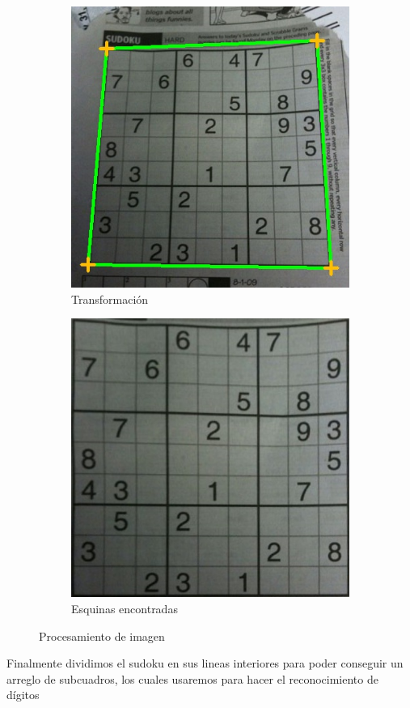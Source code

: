 \documentclass{article}
\begin{document}
\begin{figure}[H]
\centering
\begin{subfigure}{.5\textwidth}
  \centering
  \includegraphics[width=.6\linewidth]{esquinas}
  \caption{Transformaci\'on}
  \label{fig:sub1}
\end{subfigure}%
\begin{subfigure}{.5\textwidth}
  \centering
  \includegraphics[width=.6\linewidth]{transformada}
  \caption{Esquinas encontradas}
  \label{fig:sub2}
\end{subfigure}
\caption{Procesamiento de imagen}
\label{fig:test}
\end{figure}

Finalmente dividimos el sudoku en sus lineas interiores para poder conseguir
un arreglo de subcuadros, los cuales usaremos para hacer el reconocimiento de 
d\'igitos
\end{document}
